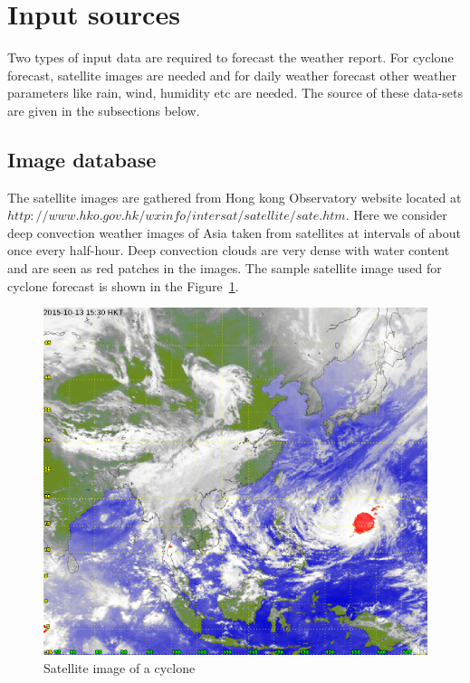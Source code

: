 \documentclass{article}
\begin{document}
\vspace{-2mm}
\section{Input sources}
\label{sec:db}
Two types of input data are required to forecast the weather report. For cyclone forecast, satellite images are needed and for daily weather forecast other weather parameters like rain, wind, humidity etc are needed. The source of these data-sets are given in the subsections below.

\subsection{Image database}
\label{ssec:imgDB}
The satellite images are gathered from Hong kong Observatory website located at $http://www.hko.gov.hk/wxinfo/intersat/satellite/sate.htm$. Here we consider deep convection weather images of Asia taken from satellites at intervals of about once every half-hour. Deep convection clouds are very dense with water content and  are seen as red patches in the images. The sample satellite image used for cyclone forecast is shown in the Figure~\ref{fig:cyclone}.

\begin{figure}[h!tb]
\centering
\includegraphics[scale=0.18]{figures/cyclone.png}
\caption{Satellite image of a cyclone}
\label{fig:cyclone}
\end{figure}
\end{document}

